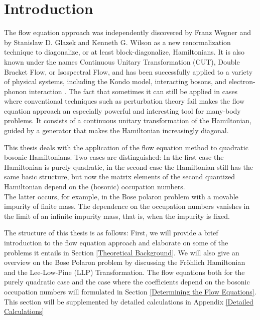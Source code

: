 \chapter{Introduction}
The flow equation approach was independently discovered by Franz Wegner \cite{https://doi.org/10.1002/andp.19945060203} and by Stanislaw D. Glazek and Kenneth G. Wilson \cite{PhysRevD.48.5863} as a new renormalization technique to diagonalize, or at least block-diagonalize, Hamiltonians. It is also known under the names Continuous Unitary Transformation (CUT), Double Bracket Flow, or Isospectral Flow, and has been successfully applied to a variety of physical systems, including the Kondo model, interacting bosons, and electron-phonon interaction \cite{Wegner_2006}. The fact that sometimes it can still be applied in cases where conventional techniques such as perturbation theory fail makes the flow equation approach an especially powerful and interesting tool for many-body problems.  It consists of a continuous unitary transformation of the Hamiltonian, guided by a generator that makes the Hamiltonian increasingly diagonal. \par
This thesis deals with the application of the flow equation method to quadratic bosonic Hamiltonians. Two cases are distinguished: In the first case the Hamiltonian is purely quadratic, in the second case the Hamiltonian still has the same basic structure, but now the matrix elements of the second quantized Hamiltonian depend on the (bosonic) occupation numbers.\\
The latter occurs, for example, in the Bose polaron problem with a movable impurity of finite mass. The dependence on the occupation numbers vanishes in the limit of an infinite impurity mass, that is, when the impurity is fixed.\par
The structure of this thesis is as follows: First, we will provide a brief introduction to the flow equation approach and elaborate on some of the problems it entails in Section \ref{Theoretical Background}. We will also give an overview on the Bose Polaron problem by discussing the Fröhlich Hamiltonian and the Lee-Low-Pine (LLP) Transformation. The flow equations  both for the purely quadratic case and the case where the coefficients depend on the bosonic occupation numbers will formulated in Section \ref{Determining the Flow Equations}. This section will be supplemented by detailed calculations in Appendix \ref{Detailed Calculations}\\
